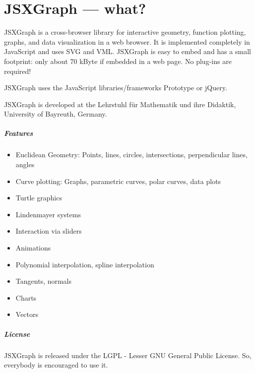 \documentclass[a4paper]{tufte-book}
\begin{document}
\mainmatter

\chapter{JSXGraph --- what?}
\label{ch:what}


JSXGraph is a cross-browser library for interactive geometry, function plotting, graphs, and data visualization in a web browser. It is implemented completely in JavaScript and uses SVG and VML.
JSXGraph is easy to embed and has a small footprint: only about 70 kByte if embedded in a web page. No plug-ins are required! 

JSXGraph uses the JavaScript libraries/frameworks Prototype or jQuery.

JSXGraph is developed at the Lehrstuhl f\"ur Mathematik und ihre Didaktik, University of Bayreuth, Germany.


\paragraph{Features}
\begin{itemize}
    \item Euclidean Geometry: Points, lines, circles, intersections, perpendicular lines, angles
    \item  Curve plotting: Graphs, parametric curves, polar curves, data plots
    \item  Turtle graphics
    \item  Lindenmayer systems
    \item  Interaction via sliders
    \item  Animations
    \item  Polynomial interpolation, spline interpolation
    \item  Tangents, normals
    \item  Charts
    \item  Vectors
\end{itemize}

\paragraph{License}

JSXGraph is released under the LGPL - Lesser GNU General Public License. So, everybody is encouraged to use it.
\end{document}
